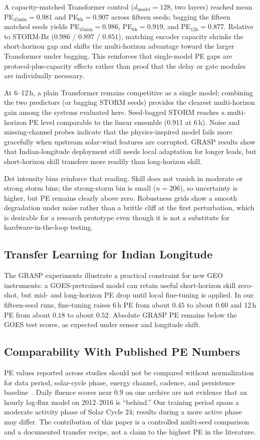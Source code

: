 ﻿\documentclass{ieeeaccess}
\begin{document}
A capacity-matched Transformer control ($d_{\mathrm{model}}=128$, two layers)
reached mean PE$_{45\mathrm{min}}=0.981$ and PE$_{6\mathrm{h}}=0.907$ across
fifteen seeds; bagging the fifteen matched seeds yields PE$_{45\mathrm{min}}=0.986$,
PE$_{6\mathrm{h}}=0.919$, and PE$_{12\mathrm{h}}=0.877$. Relative to STORM-Bz
($0.986$ / $0.897$ / $0.851$), matching encoder capacity shrinks the short-horizon
gap and shifts the multi-horizon advantage toward the larger Transformer under
bagging. This reinforces that single-model PE gaps are protocol-plus-capacity
effects rather than proof that the delay or gate modules are individually necessary.

At 6--12\,h, a plain Transformer remains competitive as a
single model; combining the two predictors (or bagging STORM seeds)
provides the clearest multi-horizon gain among the systems evaluated here.
Seed-bagged STORM reaches a multi-horizon PE level comparable to the linear ensemble (0.911 at 6\,h).
Noise and missing-channel probes indicate that the physics-inspired model
fails more gracefully when upstream solar-wind features are corrupted.
GRASP results show that Indian-longitude deployment still needs local
adaptation for longer leads, but short-horizon skill transfers more
readily than long-horizon skill.

Dst intensity bins reinforce that reading. Skill does not vanish in moderate or
strong storm bins; the strong-storm bin is small (\(n=206\)), so uncertainty is
higher, but PE remains clearly above zero. Robustness grids show a smooth
degradation under noise rather than a brittle cliff at the first perturbation,
which is desirable for a research prototype even though it is not a substitute
for hardware-in-the-loop testing.

\subsection{Transfer Learning for Indian Longitude}
The GRASP experiments illustrate a practical constraint for new GEO instruments:
a GOES-pretrained model can retain useful short-horizon skill zero-shot, but
mid- and long-horizon PE drop until local fine-tuning is applied.
In our fifteen-seed runs, fine-tuning raises 6\,h PE from about \(0.45\) to about
\(0.60\) and 12\,h PE from about \(0.18\) to about \(0.52\). Absolute GRASP PE
remains below the GOES test scores, as expected under sensor and longitude shift.

\subsection{Comparability With Published PE Numbers}
PE values reported across studies should not be compared without normalization
for data period, solar-cycle phase, energy channel, cadence, and persistence
baseline~\cite{b21,b22}. Daily fluence scores near 0.9 on one archive are not
evidence that an hourly log-flux model on 2012--2016 is ``behind.'' Our training
period spans a moderate activity phase of Solar Cycle 24; results during a more
active phase may differ. The contribution of this paper is a controlled
multi-seed comparison and a documented transfer recipe, not a claim to the
highest PE in the literature.
\end{document}
